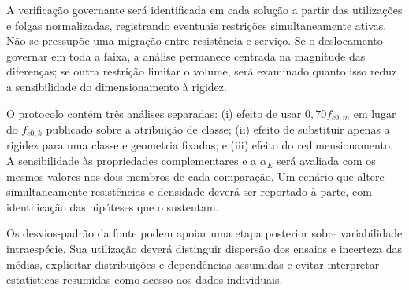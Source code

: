A verificação governante será identificada em cada solução a partir das utilizações e folgas normalizadas, registrando eventuais restrições simultaneamente ativas. Não se pressupõe uma migração entre resistência e serviço. Se o deslocamento governar em toda a faixa, a análise permanece centrada na magnitude das diferenças; se outra restrição limitar o volume, será examinado quanto isso reduz a sensibilidade do dimensionamento à rigidez.

O protocolo contém três análises separadas: (i) efeito de usar $0{,}70f_{c0,m}$ em lugar do $f_{c0,k}$ publicado sobre a atribuição de classe; (ii) efeito de substituir apenas a rigidez para uma classe e geometria fixadas; e (iii) efeito do redimensionamento. A sensibilidade às propriedades complementares e a $\alpha_E$ será avaliada com os mesmos valores nos dois membros de cada comparação. Um cenário que altere simultaneamente resistências e densidade deverá ser reportado à parte, com identificação das hipóteses que o sustentam.

Os desvios-padrão da fonte podem apoiar uma etapa posterior sobre variabilidade intraespécie. Sua utilização deverá distinguir dispersão dos ensaios e incerteza das médias, explicitar distribuições e dependências assumidas e evitar interpretar estatísticas resumidas como acesso aos dados individuais.

